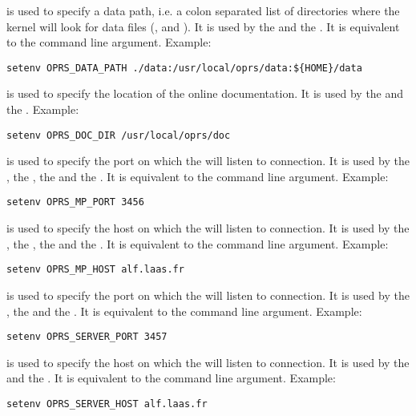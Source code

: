\begin{description}

\item[\code{OPRS\_DATA\_PATH}] is used  to specify a data path, i.e. a colon separated
list of directories where the kernel will look for data files (,
 and ). It is used by the \CPK{} and the \XPK{}. It is
equivalent to the  command line argument.\*
Example:
\begin{verbatim}
setenv OPRS_DATA_PATH ./data:/usr/local/oprs/data:${HOME}/data
\end{verbatim}

\item[\code{OPRS\_DOC\_DIR}] is used  to specify the location of the online \COPRSDE{}
documentation. It is used by the \XPK{} and the \OPE{}.
Example:
\begin{verbatim}
setenv OPRS_DOC_DIR /usr/local/oprs/doc
\end{verbatim}

\item[\code{OPRS\_MP\_PORT}] is used  to specify the port on which the \MP{} will
listen to connection. It is used by the \CPK{}, the \XPK{}, the \OPRSS{}
and the \MP{}. It is equivalent to the  command line argument. \*
Example:
\begin{verbatim}
setenv OPRS_MP_PORT 3456
\end{verbatim}

\item[\code{OPRS\_MP\_HOST}] is used  to specify the host on which the \MP{} will
listen to connection. It is used by the \CPK{}, the \XPK{}, the \MP{} and the
\OPRSS{}. It is equivalent to the  command line argument.\*
Example:
\begin{verbatim}
setenv OPRS_MP_HOST alf.laas.fr
\end{verbatim}

\item[\code{OPRS\_SERVER\_PORT}] is used to specify the port on which the
\OPRSS{} will listen to connection. It is used by the \CPK{}, the \XPK{}
and the \OPRSS{}. It is equivalent to the  command line argument.\*
Example:
\begin{verbatim}
setenv OPRS_SERVER_PORT 3457
\end{verbatim}

\item[\code{OPRS\_SERVER\_HOST}] is used to specify the host on which the
\OPRSS{} will listen to connection. It is used by the \CPK{} and the
\XPK{}. It is equivalent to the  command line argument.\*
Example:
\begin{verbatim}
setenv OPRS_SERVER_HOST alf.laas.fr
\end{verbatim}


\end{description}

